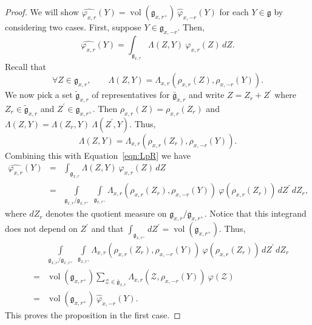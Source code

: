 \documentclass[11pt]{amsart}
\theoremstyle{definition}
\theoremstyle{remark}
\numberwithin{equation}{theorem}
\def\gF{{\mathfrak{g}}}
\newcommand{\mf}{{\bar\gF}}
\def\vphi{{\varphi}}
\def\hphi{{\hat{\varphi}}}
\def\Z{{\mathcal{Z}}}
\def\kill#1#2{{\Lambda\left({#1},{#2}\right)}}
\def\vol{{\operatorname{vol}}}
\def\vol{\operatorname{vol}}
\begin{document}
\begin{proof}
We will show $\widehat{\vphi_{x,r}}(Y) = \vol(\gF_{x,r^+})\
\hphi_{x,-r}(Y)$ for each $Y\in\gF$ by considering two cases.
First, suppose $Y \in \gF_{x,-r}$. Then,
\begin{equation}
    \widehat{\vphi_{x,r}}(Y) = \int_{\gF_{x,r}} \kill{Z}{Y}\
    \vphi_{x,r}(Z)\, dZ.
    \label{eqn:LpR}
\end{equation}
Recall that
\begin{equation}
\forall
    Z\in\gF_{x,r},\qquad
\kill{Z}{Y} = \Lambda_{x,r}(\rho_{x,r}(Z),\rho_{x,-r}(Y)).
\end{equation}
We now pick a set $\tilde{\gF}_{x,r}$ of representatives for
$\mf_{x,r}$ and write $Z = Z_{r} + Z^\prime$ where $Z_{r} \in
\tilde{\gF}_{x,r}$ and $Z^\prime \in \gF_{x,r^+}$.  Then
$\rho_{x,r}(Z) = \rho_{x,r}(Z_r)$ and $\kill{Z}{Y} =
\kill{Z_r}{Y}\ \kill{Z^\prime}{Y}$. Thus,
\begin{equation}
\kill{Z}{Y} = \Lambda_{x,r}(\rho_{x,r}(Z_r),\rho_{x,-r}(Y)).
\end{equation}
Combining this with Equation~\ref{eqn:LpR} we have
\begin{eqnarray*}
\widehat{\vphi_{x,r}}(Y)
 &=& \int_{\gF_{x,r}} \kill{Z}{Y}\ \vphi_{x,r}(Z)\, dZ\\
 &=& \int\limits_{\gF_{x,r} / \gF_{x,r^+}}\ \int\limits_{\gF_{x,r^+}}
\Lambda_{x,r}(\rho_{x,r}(Z_r),\rho_{x,-r}(Y))\
\vphi(\rho_{x,r}(Z_r))\, dZ^\prime\, dZ_r,
\end{eqnarray*}
where $dZ_r$ denotes the quotient measure on $ \gF_{x,r} /
\gF_{x,r^+}$. Notice that this integrand does not depend on
$Z^\prime$ and that $\int_{\gF_{x,r^+}}dZ^\prime =
\vol(\gF_{x,r^+})$. Thus,
\begin{eqnarray*}
&& \int\limits_{\gF_{x,r} / \gF_{x,r^+}}\
\int\limits_{\gF_{x,r^+}}
\Lambda_{x,r}(\rho_{x,r}(Z_r),\rho_{x,-r}(Y))\
\vphi(\rho_{x,r}(Z_r))\, dZ^\prime\, dZ_r\\
 &=& \vol(\gF_{x,r^+})
\sum_{\Z \in \mf_{x,r}}
        \Lambda_{x,r}(\Z,\rho_{x,-r}(Y))\ \vphi(\Z)\\
 &=& \vol(\gF_{x,r^+})\ \hphi_{x,-r}(Y).
\end{eqnarray*}
This proves the proposition in the first case.


\end{proof}
\end{document}
